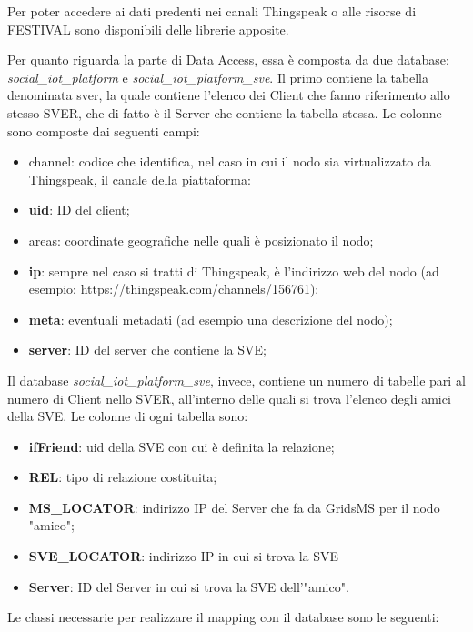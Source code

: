 Per poter accedere ai dati predenti nei canali Thingspeak o alle risorse di FESTIVAL sono disponibili delle librerie apposite.

Per quanto riguarda la parte di Data Access, essa è composta da due database: \textit{social\_iot\_platform} e \textit{social\_iot\_platform\_sve}. Il primo contiene la tabella denominata sver, la quale contiene l'elenco dei Client che fanno riferimento allo stesso SVER, che di fatto è il Server che contiene la tabella stessa. Le colonne sono composte dai seguenti campi:

\begin{itemize}
    \item channel: codice che identifica, nel caso in cui il nodo sia virtualizzato da Thingspeak, il canale della piattaforma:
    \item \textbf{uid}: ID del client;
    \item areas: coordinate geografiche nelle quali è posizionato il nodo;
    \item \textbf{ip}: sempre nel caso si tratti di Thingspeak, è l'indirizzo web del nodo (ad esempio: https://thingspeak.com/channels/156761);
    \item \textbf{meta}: eventuali metadati (ad esempio una descrizione del nodo);
    \item \textbf{server}: ID del server che contiene la SVE;
\end{itemize}

Il database \textit{social\_iot\_platform\_sve}, invece, contiene un numero di tabelle pari al numero di Client nello SVER, all'interno delle quali si trova l'elenco degli amici della SVE. Le colonne di ogni tabella sono:

\begin{itemize}
    \item \textbf{ifFriend}: uid della SVE con cui è definita la relazione;
    \item \textbf{REL}: tipo di relazione costituita;
    \item \textbf{MS\_LOCATOR}: indirizzo IP del Server che fa da GridsMS per il nodo "amico"; 
    \item \textbf{SVE\_LOCATOR}: indirizzo IP in cui si trova la SVE 
    \item \textbf{Server}: ID del Server in cui si trova la SVE dell'"amico".
\end{itemize}

Le classi necessarie per realizzare il mapping con il database sono le seguenti: 

